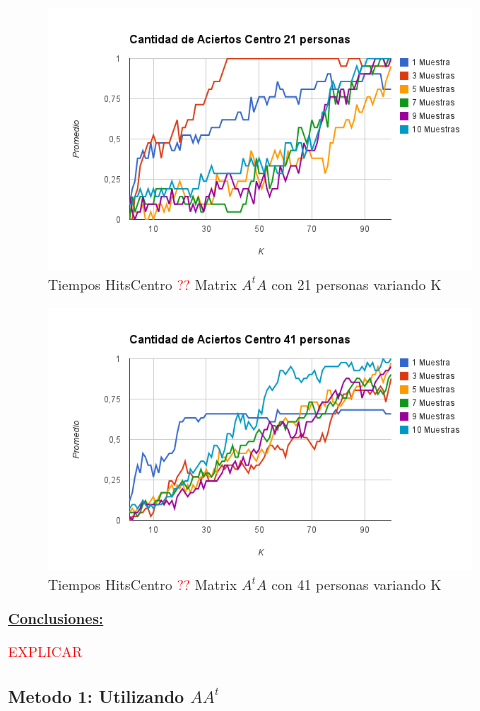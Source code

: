 \begin{figure}[H]
\includegraphics[width=1\textwidth]{img/image14.png}
     \caption{Tiempos HitsCentro \textcolor{red}{??} Matrix $A^tA$ con 21 personas variando K}
     \label{fig:figura1}
\end{figure}

\begin{figure}[H]
\includegraphics[width=1\textwidth]{img/image15.png}
     \caption{Tiempos HitsCentro \textcolor{red}{??} Matrix $A^tA$ con 41 personas variando K}
     \label{fig:figura1}
\end{figure}

\underline{\textbf{Conclusiones:}}

\textcolor{red}{EXPLICAR}


\subsubsection{Metodo 1: Utilizando $AA^t$}

